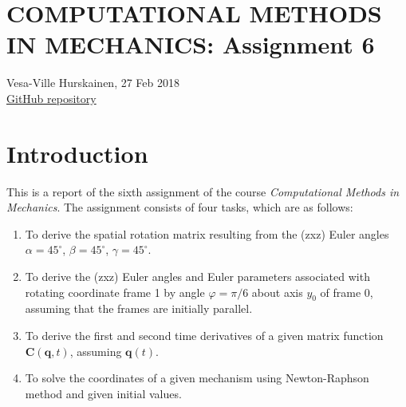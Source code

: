 \documentclass{article}
\begin{document}
\section*{COMPUTATIONAL METHODS IN MECHANICS: Assignment 6}
Vesa-Ville Hurskainen, 27 Feb 2018\\
\href{https://github.com/VesaVilleHurskainen/cmim2018}{GitHub repository}

\section*{Introduction}
This is a report of the sixth assignment of the course \textit{Computational Methods in Mechanics}. The assignment consists of four tasks, which are as follows:
\begin{enumerate}
	\setlength\itemsep{0pt}
	\item To derive the spatial rotation matrix resulting from the (zxz) Euler angles $\alpha = 45^\circ$, $\beta = 45^\circ$, $\gamma = 45^\circ$.
	\item To derive the (zxz) Euler angles and Euler parameters associated with rotating coordinate frame 1 by angle $\varphi = \pi/6$ about axis $y_0$ of frame 0, assuming that the frames are initially parallel.
	\item To derive the first and second time derivatives of a given matrix function $\mathbf{C}(\bm{q},t)$, assuming $\bm{q}(t)$.
	\item To solve the coordinates of a given mechanism using Newton-Raphson method and given initial values.
\end{enumerate}
\end{document}
